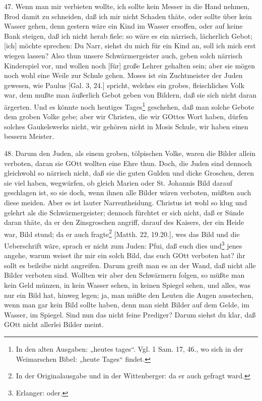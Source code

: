 47. Wenn man mir verbieten wollte, ich sollte kein Messer in die Hand nehmen, Brod damit zu schneiden, daß ich mir nicht Schaden thäte, oder sollte über kein Wasser gehen, denn gestern wäre ein Kind im Wasser ersoffen, oder auf keine Bank steigen, daß ich nicht herab fiele: so wäre es ein närrisch, lächerlich Gebot; [ich] möchte sprechen: Du Narr, siehst du mich für ein Kind an, soll ich mich erst wiegen lassen? Also thun unsere Schwärmergeister auch, geben solch närrisch Kinderspiel vor, und wollen noch [für] große Lehrer gehalten sein; aber sie mögen noch wohl eine Weile zur Schule gehen. Moses ist ein Zuchtmeister der Juden gewesen, wie Paulus [Gal. 3, 24.] spricht, welches ein grobes, fleischliches Volk war, dem mußte man äußerlich Gebot geben von Bildern, daß sie sich nicht daran ärgerten. Und es könnte noch heutiges Tages\footnote{In den alten Ausgaben: „heutes tages“. Vgl. 1 Sam. 17, 46., wo sich in der Weimarschen Bibel: „heute Tages“ findet.} geschehen, daß man solche Gebote dem groben Volke gebe; aber wir Christen, die wir GOttes Wort haben, dürfen solches Gaukelswerks nicht, wir gehören nicht in Mosis Schule, wir haben einen bessern Meister.

48. Darum den Juden, als einem groben, tölpischen Volke, waren die Bilder allein verboten, daran sie GOtt wollten eine Ehre thun. Doch, die Juden sind dennoch gleichwohl so närrisch nicht, daß sie die guten Gulden und dicke Groschen, deren sie viel haben, wegwürfen, ob gleich Marien oder St. Johannis Bild darauf geschlagen ist, so sie doch, wenn ihnen alle Bilder wären verboten, müßten auch diese meiden. Aber es ist lauter Narrentheidung. Christus ist wohl so klug und gelehrt als die Schwärmergeister; dennoch fürchtet er sich nicht, daß er Sünde daran thäte, da er den Zinsgroschen angriff, darauf des Kaisers, der ein Heide war, Bild stund; da er auch fragte\footnote{In der Originalausgabe und in der Wittenberger: da er auch gefragt ward.} [Matth. 22, 19.20.], wes das Bild und die Ueberschrift wäre, sprach er nicht zum Juden: Pfui, daß euch dies und\footnote{Erlanger: oder.} jenes angehe, warum weiset ihr mir ein solch Bild, das euch GOtt verboten hat? ihr sollt es beileibe nicht angreifen. Darum greift man es an der Wand, daß nicht alle Bilder verboten sind. Wollten wir aber den Schwärmern folgen, so müßte man kein Geld münzen, in kein Wasser sehen, in keinen Spiegel sehen, und alles, was nur ein Bild hat, hinweg legen; ja, man müßte den Leuten die Augen ausstechen, wenn man gar kein Bild sollte haben, denn man sieht Bilder auf dem Gelde, im Wasser, im Spiegel. Sind nun das nicht feine Prediger? Darum siehst du klar, daß GOtt nicht allerlei Bilder meint.

